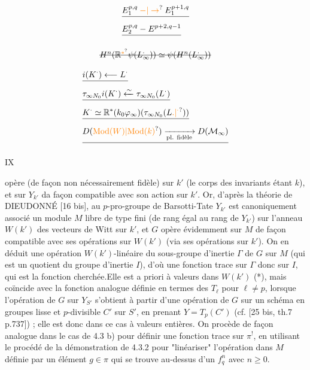 
\[
\begin{aligned}
&\deleted{E_1^{p,q}\mathbin{\unsure{-|\to}} E_1^{p+1,q}}\\
&\deleted{E_2^{p,q}\mathbin{-} E^{p+2,q-1}}
\end{aligned}
\]


\[
\deleted{H^n(\mathbb R^{\unsure{*}}\psi(L_\infty^\cdot))\simeq\psi(H^n(L_\infty^\cdot))}
\]

\[
\begin{aligned}
&\deleted{i(K^\cdot)\longleftarrow L^\cdot}\\
&\deleted{\tau_{\infty N_0}i(K^\cdot)\xleftarrow{\sim}\tau_{\infty N_0}(L^\cdot)}\\
&\deleted{K^\cdot\simeq\mathbb R^*(k_0\varphi_\infty)(\tau_{\infty N_0}(L\unsure{.|{}^{\cdot}}))}\\
&\deleted{D(\unsure{\mathrm{Mod}(W)|\mathrm{Mod}(k)})\xrightarrow[\text{pl. fidèle}]{}D(\mathcal M_\infty)}
\end{aligned}
\]

\hfill IX

opère (de façon non nécessairement fidèle) sur $k'$ (le corps des invariants étant $k$), et sur $Y_{k'}$ da façon compatible avec son action sur $k'$. Or, d'après la théorie de DIEUDONNÉ [16 bis], au $p$-pro-groupe de Barsotti-Tate $Y_{k'}$ est canoniquement associé un module $M$ libre de type fini (de rang égal au rang de $Y_{k'}$) sur l'anneau $W(k')$ des vecteurs de Witt sur $k'$, et $G$ opère évidemment sur $M$ de façon compatible avec ses opérations sur $W(k')$ (via ses opérations sur $k'$). On en déduit une opération $W(k')$-linéaire du sous-groupe d'inertie $\Gamma$ de $G$ sur $M$ (qui est un quotient du groupe d'inertie $I$), d'où une fonction trace sur $\Gamma$ donc sur $I$, qui est la fonction cherchée.Elle est a priori à valeurs dans $W(k')$ (*), mais coïncide avec la fonction analogue définie en termes des $T_\ell$ pour $\ell\ne p$, lorsque l'opération de $G$ sur $Y_{S'}$ s'obtient à partir d'une opération de $G$ sur un schéma en groupes lisse et $p$-divisible $C'$ sur $S'$, en prenant $Y=T_p(C')$ (cf. [25 bis, th.7 p.737]) ; elle est donc dans ce cas à valeurs entières. On procède de façon analogue dans le cas de 4.3 b) pour définir une fonction trace sur $\pi^!$, en utilisant le procédé de la démonstration de 4.3.2 pour "linéariser" l'opération dans $M$ définie par un élément $g\in\pi$ qui se trouve au-dessus d'un $f_q^n$ avec $n\geq0$.

